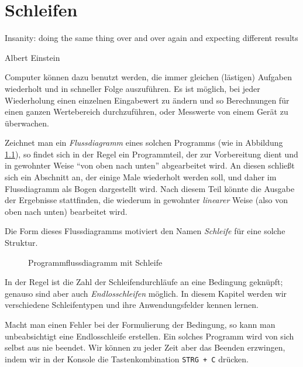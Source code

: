 \chapter{Schleifen}
\label{chp:loops}
\epigraph{
	Insanity: doing the same thing over and over again and expecting different results
}{Albert Einstein}

Computer können dazu benutzt werden, die immer gleichen (lästigen) Aufgaben wiederholt und in schneller Folge auszuführen. Es ist möglich, bei jeder Wiederholung einen einzelnen Eingabewert zu ändern und so \eg Berechnungen für einen ganzen Wertebereich durchzuführen, oder Messwerte von einem Gerät zu überwachen.

Zeichnet man ein \emph{Flussdiagramm} eines solchen Programms (wie in Abbildung \ref{fig:FlowBasicLoop}), so findet sich in der Regel ein Programmteil, der zur Vorbereitung dient und in gewohnter Weise \enquote{von oben nach unten} abgearbeitet wird. An diesen schließt sich ein Abschnitt an, der einige Male wiederholt werden soll, und daher im Flussdiagramm als Bogen dargestellt wird. Nach diesem Teil könnte die Ausgabe der Ergebnisse stattfinden, die wiederum in gewohnter \emph{linearer} Weise (also von oben nach unten) bearbeitet wird. 

Die Form dieses Flussdiagramms motiviert den Namen \emph{Schleife} für eine solche Struktur.

\begin{figure}[h!]
\begin{center}
\caption{Programmflussdiagramm mit Schleife} \label{fig:FlowBasicLoop}
\end{center}
\end{figure}

In der Regel ist die Zahl der Schleifendurchläufe an eine Bedingung geknüpft; genauso sind aber auch \emph{Endlosschleifen} möglich. In diesem Kapitel werden wir verschiedene Schleifentypen und ihre Anwendungsfelder kennen lernen.

\begin{hintbox}
Macht man einen Fehler bei der Formulierung der Bedingung, so kann man unbeabsichtigt eine Endlosschleife erstellen. Ein solches Programm wird von sich selbst aus nie beendet. Wir können zu jeder Zeit aber das Beenden erzwingen, indem wir in der Konsole die Tastenkombination \texttt{STRG + C} drücken.
\end{hintbox}

